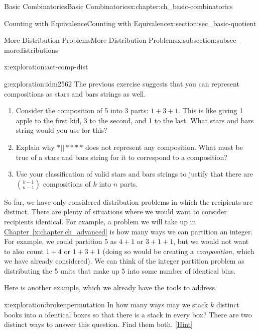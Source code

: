 \documentclass[oneside,10pt,]{book}
\numberwithin{equation}{chapter}
\begin{document}
\begin{chapterptx}{Basic Combinatorics}{}{Basic Combinatorics}{}{}{x:chapter:ch_basic-combinatorics}
\begin{sectionptx}{Counting with Equivalence}{}{Counting with Equivalence}{}{}{x:section:sec_basic-quotient}
\begin{subsectionptx}{More Distribution Problems}{}{More Distribution Problems}{}{}{x:subsection:subsec-moredistributions}
\begin{exploration}{}{x:exploration:act-comp-dist}
\end{exploration}
\begin{exploration}{}{g:exploration:idm2562}%
The previous exercise suggests that you can represent compositions as stars and bars strings as well.%
\begin{enumerate}[font=\bfseries,label=(\alph*),ref=\alph*]
\item{}Consider the composition of 5 into 3 parts: \(1+3+1\).  This is like giving 1 apple to the first kid, 3 to the second, and 1 to the last.  What stars and bars string would you use for this?%
\item{}Explain why \(*||****\) does not represent any composition.  What must be true of a stars and bars string for it to correspond to a composition?%
\item{}Use your classification of valid stars and bars strings to justify that there are \(\binom{k-1}{n-1}\) compositions of \(k\) into \(n\) parts.%
\end{enumerate}
\end{exploration}
So far, we have only considered distribution problems in which the recipients are distinct.  There are plenty of situations where we would want to consider recipients identical.  For example, a problem we will take up in \hyperref[x:chapter:ch_advanced]{Chapter~\ref{x:chapter:ch_advanced}} is how many ways we can partition an integer.  For example, we could partition 5 as \(4+1\) or \(3+1+1\), but we would not want to also count \(1+4\) or \(1+3+1\) (doing so would be creating a \emph{composition}, which we have already considered).  We can think of the integer partition problem as distributing the 5 units that make up 5 into some number of identical bins.%
\par
Here is another example, which we already have the tools to address.%
\begin{exploration}{}{x:exploration:brokenpermutation}%
In how many ways may we stack \(k\) distinct books into \(n\) identical boxes so that there is a stack in every box? There are two distinct ways to answer this question.  Find them both.%
\space\hspace*{0pt}\hfill{\tiny\hyperlink{g:hint:idm2592-back}{[Hint]}}\end{exploration}

\end{subsectionptx}
\end{sectionptx}
\end{chapterptx}
\end{document}
